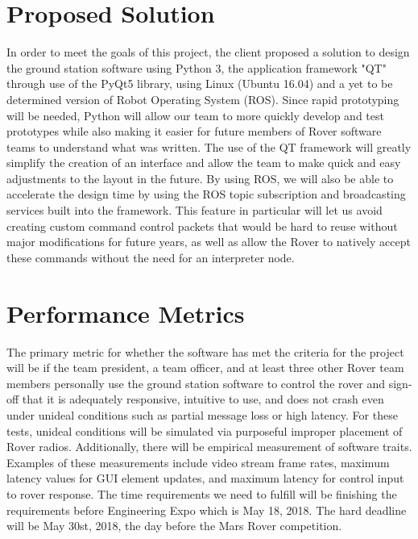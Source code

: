 \documentclass[onecolumn, draftclsnofoot, 10pt, compsoc]{IEEEtran}
\begin{document}
\section{Proposed Solution}
In order to meet the goals of this project, the client proposed a solution to design the ground station software using Python 3, the application framework "QT" through use of the PyQt5 library, using Linux (Ubuntu 16.04) and a yet to be determined version of Robot Operating System (ROS).
Since rapid prototyping will be needed, Python will allow our team to more quickly develop and test prototypes while also making it easier for future members of Rover software teams to understand what was written. 
The use of the QT framework will greatly simplify the creation of an interface and allow the team to make quick and easy adjustments to the layout in the future. 
By using ROS, we will also be able to accelerate the design time by using the ROS topic subscription and broadcasting services built into the framework. 
This feature in particular will let us avoid creating custom command control packets that would be hard to reuse without major modifications for future years, as well as allow the Rover to natively accept these commands without the need for an interpreter node.

\section{Performance Metrics}
The primary metric for whether the software has met the criteria for the project will be if the team president, a team officer, and at least three other Rover team members personally use the ground station software to control the rover and sign-off that it is adequately responsive, intuitive to use, and does not crash even under unideal conditions such as partial message loss or high latency. 
For these tests, unideal conditions will be simulated via purposeful improper placement of Rover radios.
Additionally, there will be empirical measurement of software traits. 
Examples of these measurements include video stream frame rates, maximum latency values for GUI element updates, and maximum latency for control input to rover response.
The time requirements we need to fulfill will be finishing the requirements before Engineering Expo which is May 18, 2018. The hard deadline will be May 30st, 2018, the day before the Mars Rover competition. 
\end{document}
